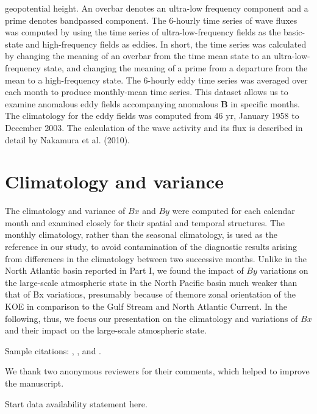 \documentclass{ametsocv6.1}
\begin{document}
geopotential height. An overbar denotes an ultra-low frequency
component and a prime denotes bandpassed
component. The 6-hourly time series of wave fluxes was
computed by using the time series of ultra-low-frequency
fields as the basic-state and high-frequency fields as eddies.
In short, the time series was calculated by changing the
meaning of an overbar from the time mean state to an
ultra-low-frequency state, and changing the meaning of a
prime from a departure from the mean to a high-frequency
state. The 6-hourly eddy time series was averaged over each
month to produce monthly-mean time series. This dataset
allows us to examine anomalous eddy fields accompanying
anomalous $\mathbf B$ in specific months. The climatology for
the eddy fields was computed from 46 yr, January 1958 to
December 2003. The calculation of the wave activity and
its flux is described in detail by Nakamura et al. (2010).


\section{Climatology and variance}
The climatology and variance of $Bx$ and $By$ were computed
for each calendar month and examined closely for
their spatial and temporal structures. The monthly climatology,
rather than the seasonal climatology, is used as the
reference in our study, to avoid contamination of the diagnostic
results arising from differences in the climatology
between two successive months. Unlike in the North Atlantic
basin reported in Part I, we found the impact of $By$
variations on the large-scale atmospheric state in the
North Pacific basin much weaker than that of Bx variations,
presumably because of themore zonal orientation of
the KOE in comparison to the Gulf Stream and North
Atlantic Current. In the following, thus, we focus our
presentation on the climatology and variations of $Bx$ and
their impact on the large-scale atmospheric state.

Sample citations: \citet{Becker+Schmitz2003}, \citet{Knutti2008},
and \citep{MeixnerEA2002,Kuji_Nakajima2002,EmeryEA1986}.

\clearpage
\acknowledgments
We thank two anonymous reviewers for their comments, which helped
to improve the manuscript.

\datastatement
Start data availability statement here.
\end{document}
